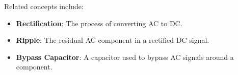 Related concepts include:
\begin{itemize}
    \item \textbf{Rectification}: The process of converting AC to DC.
    \item \textbf{Ripple}: The residual AC component in a rectified DC signal.
    \item \textbf{Bypass Capacitor}: A capacitor used to bypass AC signals around a component.
\end{itemize}

